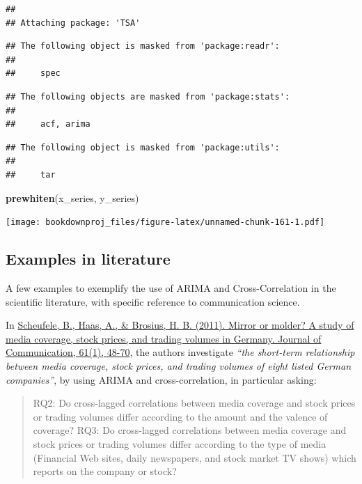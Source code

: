 \documentclass[
]{article}
\newenvironment{Shaded}{\begin{snugshade}}{\end{snugshade}}
\newcommand{\KeywordTok}[1]{\textcolor[rgb]{0.13,0.29,0.53}{\textbf{#1}}}
\newcommand{\NormalTok}[1]{#1}
\begin{document}
\begin{verbatim}
## 
## Attaching package: 'TSA'
\end{verbatim}

\begin{verbatim}
## The following object is masked from 'package:readr':
## 
##     spec
\end{verbatim}

\begin{verbatim}
## The following objects are masked from 'package:stats':
## 
##     acf, arima
\end{verbatim}

\begin{verbatim}
## The following object is masked from 'package:utils':
## 
##     tar
\end{verbatim}

\begin{Shaded}
\begin{Highlighting}[]
\KeywordTok{prewhiten}\NormalTok{(x_series, y_series)}
\end{Highlighting}
\end{Shaded}

\texttt{[image: bookdownproj\_files/figure-latex/unnamed-chunk-161-1.pdf]}

\hypertarget{examples-in-literature}{%
\subsection{Examples in literature}\label{examples-in-literature}}

A few examples to exemplify the use of ARIMA and Cross-Correlation in the scientific literature, with specific reference to communication science.

In \href{https://academic.oup.com/joc/article/61/1/48/4098436?casa_token=b3Cd_02sN9IAAAAA:MM9rnMjb14X1ZSqxrcswoO3CDEYHry97L9EG9vL4dt5kpkZryx8VSlR8F_wXaOmBBu9VZvqlrLCZ0w}{Scheufele, B., Haas, A., \& Brosius, H. B. (2011). Mirror or molder? A study of media coverage, stock prices, and trading volumes in Germany. Journal of Communication, 61(1), 48-70}, the authors investigate \emph{``the short-term relationship between media coverage, stock prices, and trading volumes of eight listed German companies''}, by using ARIMA and cross-correlation, in particular asking:

\begin{quote}
RQ2: Do cross-lagged correlations between media coverage and stock prices or trading volumes differ according to the amount and the valence of coverage?
RQ3: Do cross-lagged correlations between media coverage and stock prices or trading volumes differ according to the type of media (Financial Web sites, daily newspapers, and stock market TV shows) which reports on the company or stock?
\end{quote}
\end{document}

